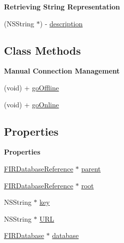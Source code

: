\begin{Indent}{\bf Retrieving String Representation}\par
\begin{DoxyCompactItemize}
\item 
(N\+S\+String $\ast$) -\/ \hyperlink{interface_f_i_r_database_reference_a204cc9916d031d0a6ae9c6b60fceb058}{description}
\end{DoxyCompactItemize}
\end{Indent}
\subsection*{Class Methods}
\begin{Indent}{\bf Manual Connection Management}\par
\begin{DoxyCompactItemize}
\item 
(void) + \hyperlink{interface_f_i_r_database_reference_a674b38324a6e89dcd51510888f3fafca}{go\+Offline}
\item 
(void) + \hyperlink{interface_f_i_r_database_reference_ab1300446aea5950fc960236b85ff0a5d}{go\+Online}
\end{DoxyCompactItemize}
\end{Indent}
\subsection*{Properties}
\begin{Indent}{\bf Properties}\par
\begin{DoxyCompactItemize}
\item 
\hyperlink{interface_f_i_r_database_reference}{F\+I\+R\+Database\+Reference} $\ast$ \hyperlink{interface_f_i_r_database_reference_ad96326c4ad0e5d3624bac296b707b957}{parent}
\item 
\hyperlink{interface_f_i_r_database_reference}{F\+I\+R\+Database\+Reference} $\ast$ \hyperlink{interface_f_i_r_database_reference_a3101c5136d2a2990c5ec3e26c01948af}{root}
\item 
N\+S\+String $\ast$ \hyperlink{interface_f_i_r_database_reference_a47283623fe88656fa9c12d0296f002eb}{key}
\item 
N\+S\+String $\ast$ \hyperlink{interface_f_i_r_database_reference_a6fd5f81300be3842a8a3c856a89d000d}{U\+R\+L}
\item 
\hyperlink{interface_f_i_r_database}{F\+I\+R\+Database} $\ast$ \hyperlink{interface_f_i_r_database_reference_a36e08d9e256dd458c129d50c09ddebfc}{database}
\end{DoxyCompactItemize}
\end{Indent}


